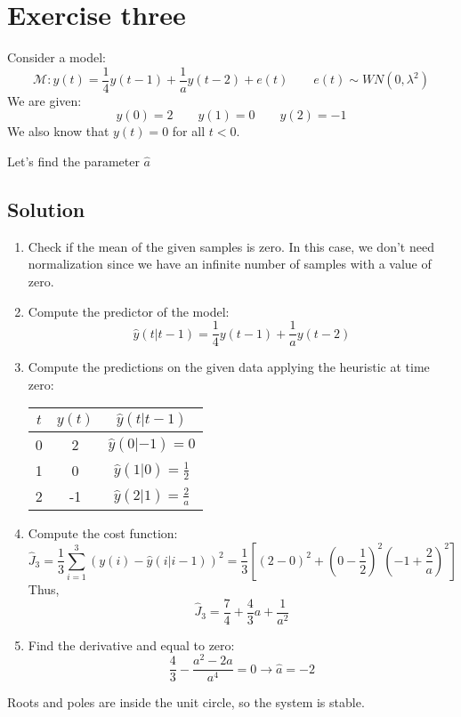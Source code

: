 \section{Exercise three}

Consider a model: 
\[\mathcal{M}:y(t)=\dfrac{1}{4}y(t-1)+\dfrac{1}{a}y(t-2)+e(t)\qquad e(t)\sim WN(0,\lambda^2)\]
We are given:
\[y(0)=2 \qquad y(1)=0 \qquad y(2)=-1\]
We also know that $y(t)=0$ for all $t < 0$. 

Let's find the parameter $\hat{a}$

\subsection*{Solution}
\begin{enumerate}
    \item Check if the mean of the given samples is zero.
        In this case, we don't need normalization since we have an infinite number of samples with a value of zero.
    \item Compute the predictor of the model:
        \[\hat{y}(t|t-1)=\dfrac{1}{4}y(t-1)+\dfrac{1}{a}y(t-2)\]
    \item Compute the predictions on the given data applying the heuristic at time zero:
        \begin{table}[H]
            \centering
            \begin{tabular}{ccc}
            \hline
            $t$ & $y(t)$ & $\hat{y}(t|t-1)$                 \\ \hline
            0   & 2      & $\hat{y}(0|-1)=0$                \\
            1   & 0      & $\hat{y}(1|0)=\frac{1}{2}$       \\
            2   & -1      & $\hat{y}(2|1)=\frac{2}{a}$      \\ \hline
            \end{tabular}
        \end{table}
    \item Compute the cost function:
        \[\hat{J}_3=\dfrac{1}{3}\sum_{i=1}^{3}\left(y(i)-\hat{y}(i|i-1)\right)^2=\dfrac{1}{3}\left[\left(2-0\right)^2+\left(0-\dfrac{1}{2}\right)^2\left(-1+\dfrac{2}{a}\right)^2\right]\]
        Thus, 
        \[\hat{J}_3=\dfrac{7}{4}+\dfrac{4}{3}a+\dfrac{1}{a^2}\]
    \item Find the derivative and equal to zero: 
        \[\dfrac{4}{3}-\dfrac{a^2-2a}{a^4}=0\rightarrow \hat{a}=-2\]
\end{enumerate}
Roots and poles are inside the unit circle, so the system is stable.